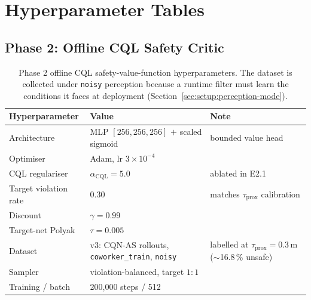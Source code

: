 \documentclass[11pt,a4paper]{report}
\newcommand{\cqnas}{CQN-AS}
\begin{document}
\clearpage
{}
{}


\appendix

\chapter{Hyperparameter Tables}
\label{app:hparams}

\section{Phase 2: Offline CQL Safety Critic}
\label{app:hparams:svf}

\begin{table}[h]
\centering
\small
\caption{Phase 2 offline CQL safety-value-function hyperparameters.
The dataset is collected under \texttt{noisy} perception because a
runtime filter must learn the conditions it faces at deployment
(Section~\ref{sec:setup:perception-mode}).}
\label{tab:app-hparams-svf}
\begin{tabular}{lll}
\toprule
Hyperparameter & Value & Note \\
\midrule
Architecture & MLP $[256, 256, 256]$ $+$ scaled sigmoid & bounded value head \\
Optimiser & Adam, lr $3\times 10^{-4}$ & \\
CQL regulariser & $\alpha_{\mathrm{CQL}} = 5.0$ & ablated in E2.1 \\
Target violation rate & $0.30$ & matches $\tau_{\mathrm{prox}}$ calibration \\
Discount & $\gamma = 0.99$ & \\
Target-net Polyak & $\tau = 0.005$ & \\
Dataset & v3: \cqnas{} rollouts, \texttt{coworker\_train}, \texttt{noisy} & labelled at $\tau_{\mathrm{prox}}{=}0.3$\,m ($\sim$16.8\,\% unsafe) \\
Sampler & violation-balanced, target $1{:}1$ & \\
Training / batch & 200{,}000 steps / 512 & \\
\bottomrule
\end{tabular}
\end{table}
\end{document}
